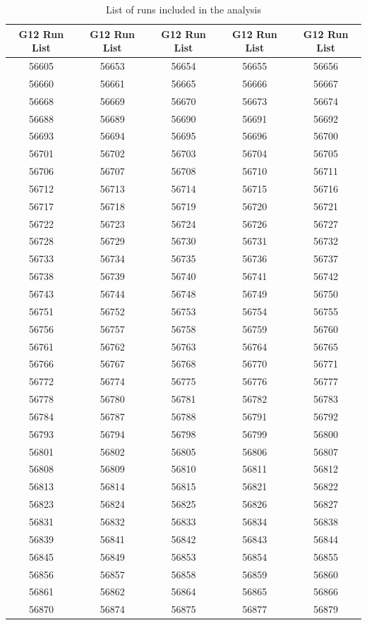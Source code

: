 \documentclass[12pt,a4paper]{amsbook}
\theoremstyle{definition}
\begin{document}
\begin{longtable}{|c|c|c|c|c|}
\caption{List of runs included in the analysis}\\
\hline
G12 Run List &G12 Run List & G12 Run List & G12 Run List & G12 Run List \\
\hline
56605&56653&56654&56655&56656\\ 
56660&56661&56665&56666&56667\\ 
56668&56669&56670&56673&56674\\ 
56688&56689&56690&56691&56692\\ 
56693&56694&56695&56696&56700\\ 
56701&56702&56703&56704&56705\\ 
56706&56707&56708&56710&56711\\ 
56712&56713&56714&56715&56716\\ 
56717&56718&56719&56720&56721\\ 
56722&56723&56724&56726&56727\\ 
56728&56729&56730&56731&56732\\ 
56733&56734&56735&56736&56737\\ 
56738&56739&56740&56741&56742\\ 
56743&56744&56748&56749&56750\\ 
56751&56752&56753&56754&56755\\ 
56756&56757&56758&56759&56760\\ 
56761&56762&56763&56764&56765\\ 
56766&56767&56768&56770&56771\\ 
56772&56774&56775&56776&56777\\ 
56778&56780&56781&56782&56783\\ 
56784&56787&56788&56791&56792\\ 
56793&56794&56798&56799&56800\\ 
56801&56802&56805&56806&56807\\ 
56808&56809&56810&56811&56812\\ 
56813&56814&56815&56821&56822\\ 
56823&56824&56825&56826&56827\\ 
56831&56832&56833&56834&56838\\ 
56839&56841&56842&56843&56844\\ 
56845&56849&56853&56854&56855\\ 
56856&56857&56858&56859&56860\\ 
56861&56862&56864&56865&56866\\ 
56870&56874&56875&56877&56879\\ 

\end{longtable}
\end{document}
